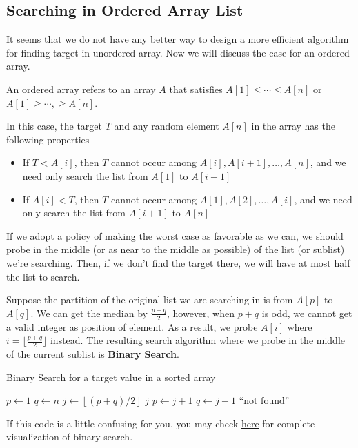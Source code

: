     \subsection{Searching in Ordered Array List}
    It seems that we do not have any better way to design a more efficient algorithm for finding target in 
    unordered array. Now we will discuss the case for an ordered array.
    \begin{definition}
        An ordered array refers to an array $A$ that satisfies $A[1]\leq \cdots \leq A[n]$ or $A[1]\geq 
        \cdots, \geq A[n]$.
    \end{definition}
    In this case, the target $T$ and any random element $A[n]$ in the array has the following properties
    \begin{itemize}
        \item  If \( T < A[i] \), then \( T \) cannot occur among \( A[i], A[i + 1], \ldots, A[n] \), and we need only search the list from \( A[1] \) to \( A[i - 1] \)
        \item  If \( A[i] < T \), then \( T \) cannot occur among \( A[1], A[2], \ldots, A[i] \), and we need only search the list from \( A[i + 1] \) to \( A[n] \)
    \end{itemize}
    If we adopt a policy of making the worst case as favorable as we can, we should
    probe in the middle (or as near to the middle as possible) of the list (or sublist) we're
    searching. Then, if we don't find the target there, we will have at most half the list to
    search.
    
    Suppose the partition of the original list we are searching in is from $A[p]$ to $A[q]$. We can get
    the median by $\frac{p+q}{2}$, however, when $p+q$ is odd, we cannot get a valid integer as position
    of element. As a result, we probe $A[i]$ where $i = \lfloor \frac{p+q}{2} \rfloor$ instead. 
    The resulting search algorithm where we probe in the middle of the current
    sublist is \textbf{Binary Search}.
    \begin{algorithm}[H]
        \caption{Binary Search for a target value in a sorted array}
        \begin{algorithmic}[1]
            \State $p \gets 1$
            \State $q \gets n$
                \State $j \gets \left\lfloor (p + q) / 2 \right\rfloor$
                    \State \Return $j$
                    \State $p \gets j + 1$
                \Else
                    \State $q \gets j - 1$
                \EndIf
            \EndWhile
            \State \Return $\text{``not found''}$
        \EndProcedure
        \end{algorithmic}
        \end{algorithm}
    \begin{remark}
        If this code is a little confusing for you, you may check \href{https://www.cs.usfca.edu/~galles/visualization/Search.html}{here}
        for complete visualization of binary search.
    \end{remark}
    
